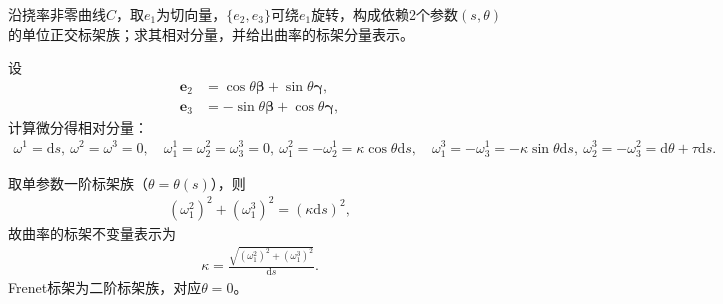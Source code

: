 \documentclass[../../main.tex]{subfiles}%
\begin{document}
\begin{example}
沿挠率非零曲线$C$，取$e_1$为切向量，$\{e_2,e_3\}$可绕$e_1$旋转，构成依赖2个参数$(s,\theta)$的单位正交标架族；求其相对分量，并给出曲率的标架分量表示。
\end{example}
\begin{solution}

设
\begin{align*}
\boldsymbol{e}_2&=\cos\theta\boldsymbol{\beta}+\sin\theta\boldsymbol{\gamma},\\
\boldsymbol{e}_3&=-\sin\theta\boldsymbol{\beta}+\cos\theta\boldsymbol{\gamma},
\end{align*}
计算微分得相对分量：
\begin{align*}
\omega^1=\mathrm{d}s,\ \omega^2=\omega^3=0,\quad \omega_1^1=\omega_2^2=\omega_3^3=0,\ \omega_1^2=-\omega_2^1=\kappa\cos\theta\mathrm{d}s,\quad \omega_1^3=-\omega_3^1=-\kappa\sin\theta\mathrm{d}s,\ \omega_2^3=-\omega_3^2=\mathrm{d}\theta+\tau\mathrm{d}s.
\end{align*}

取单参数一阶标架族（$\theta=\theta(s)$），则
\begin{align*}
(\omega_1^2)^2+(\omega_1^3)^2=(\kappa\mathrm{d}s)^2,
\end{align*}
故曲率的标架不变量表示为
\begin{align}
\kappa=\frac{\sqrt{(\omega_1^2)^2+(\omega_1^3)^2}}{\mathrm{d}s}.
\label{eq:curvature_frame}
\end{align}
Frenet标架为二阶标架族，对应$\theta=0$。

\end{solution}
\end{document}
